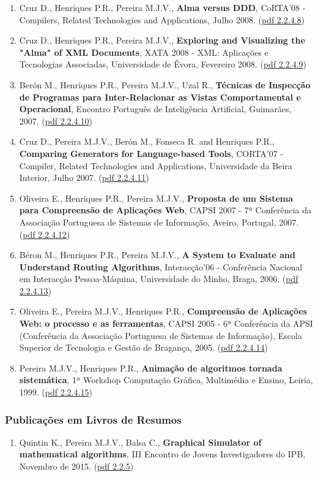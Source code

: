 \documentclass[11pt]{article}
\begin{document}
\begin{enumerate}
\item {Cruz D., Henriques P.R., Pereira M.J.V., {\bf{ Alma versus DDD}}, CoRTA'08 - Compilers, Related Technologies and Applications, Julho 2008. (\href{run:Publicacoes/publicacoes/92.pdf}{pdf 2.2.4.8})}
\item {Cruz D., Henriques P.R., Pereira M.J.V., {\bf{ Exploring and Visualizing the "Alma" of XML Documents}}, XATA 2008 - XML: Aplicações e Tecnologias Associadas, Universidade de Évora, Fevereiro 2008. (\href{run:Publicacoes/publicacoes/30.pdf}{pdf 2.2.4.9})}
\item {Berón M., Henriques P.R., Pereira M.J.V., Uzal R., {\bf{ Técnicas de Inspecção de Programas para Inter-Relacionar as Vistas Comportamental e Operacional}}, Encontro Português de Inteligência Artificial, Guimarães, 2007. (\href{run:Publicacoes/publicacoes/23.pdf}{pdf 2.2.4.10})}
\item {Cruz D., Pereira M.J.V., Berón M., Fonseca R. and Henriques P.R., {\bf{ Comparing Generators for Language-based Tools}}, CORTA'07 - Compiler, Related Technologies and Applications, Universidade da Beira Interior, Julho 2007. (\href{run:Publicacoes/publicacoes/26.pdf}{pdf 2.2.4.11}) }
\item {Oliveira E., Henriques P.R., Pereira M.J.V., {\bf{ Proposta de um Sistema para Compreensão de Aplicações Web}}, CAPSI 2007 - 7ª Conferência da Associação Portuguesa de Sistemas de Informação, Aveiro, Portugal, 2007. (\href{run:Publicacoes/publicacoes/16.pdf}{pdf 2.2.4.12})}
\item {Béron M., Henriques P.R., Pereira M.J.V., {\bf{ A System to Evaluate and Understand Routing Algorithms}}, Interacção'06 - Conferência Nacional em Interacção Pessoa-Máquina, Universidade do Minho, Braga, 2006. (\href{run:Publicacoes/publicacoes/13.pdf}{pdf 2.2.4.13})}
\item {Oliveira E., Pereira M.J.V., Henriques P.R., {\bf{ Compreensão de Aplicações Web: o processo e as ferramentas}}, CAPSI 2005 - 6ª Conferência da APSI (Conferência da Associação Portuguesa de Sistemas de Informação), Escola Superior de Tecnologia e Gestão de Bragança, 2005. (\href{run:Publicacoes/publicacoes/12.pdf}{pdf 2.2.4.14})}
\item {Pereira M.J.V., Henriques P.R., {\bf{ Animação de algoritmos tornada sistemática}}, 1ª Workshop Computação Gráfica, Multimédia e Ensino, Leiria, 1999. (\href{run:Publicacoes/publicacoes/3.pdf}{pdf 2.2.4.15})}
\end{enumerate}   

\subsubsection{Publicações em Livros de Resumos} 
\begin{enumerate}  
\item {Quintin K., Pereira M.J.V., Balsa C., {\bf{ Graphical Simulator of mathematical algorithms}}, III Encontro de Jovens Investigadores do IPB, Novembro de 2015. (\href{run:Publicacoes/GraSMA.pdf}{pdf 2.2.5})}
\end{enumerate}
\end{document}
